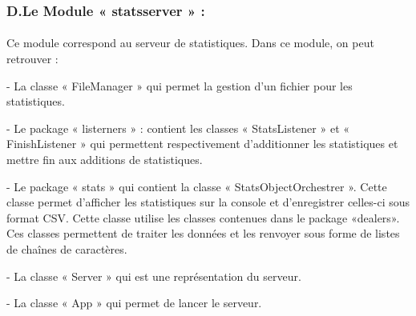 \documentclass[13pt ,a4paper ]{report}
\begin{document}
\begin{multicols}{2}
\begin{flushleft}
\end{flushleft}
		\subsubsection{D.\hspace*{0.5cm}Le Module « statsserver » :}
		\paragraph{} 
Ce module correspond au serveur de statistiques. Dans ce module, on peut retrouver :
\\
\begin{flushleft}
-	La classe « FileManager » qui permet la gestion d’un fichier pour les statistiques.
\newline

-	Le package « listerners » : contient les classes « StatsListener » et « FinishListener » qui permettent respectivement d’additionner les statistiques et mettre fin aux additions de statistiques.
\newline

-	Le package « stats » qui contient la classe « StatsObjectOrchestrer ». Cette classe permet d’afficher les statistiques sur la console et d’enregistrer celles-ci sous format CSV.
\newline
Cette classe utilise les classes contenues dans le package «dealers». Ces classes permettent de traiter les données et les renvoyer sous forme de listes de chaînes de caractères. 
\newline

-	La classe « Server » qui est une représentation du serveur.
\newline

-	La classe « App » qui permet de lancer le serveur.

\end{flushleft}

  \end{multicols} 
     
\newpage    
\setcounter{subsection}{0}      
\end{document}
